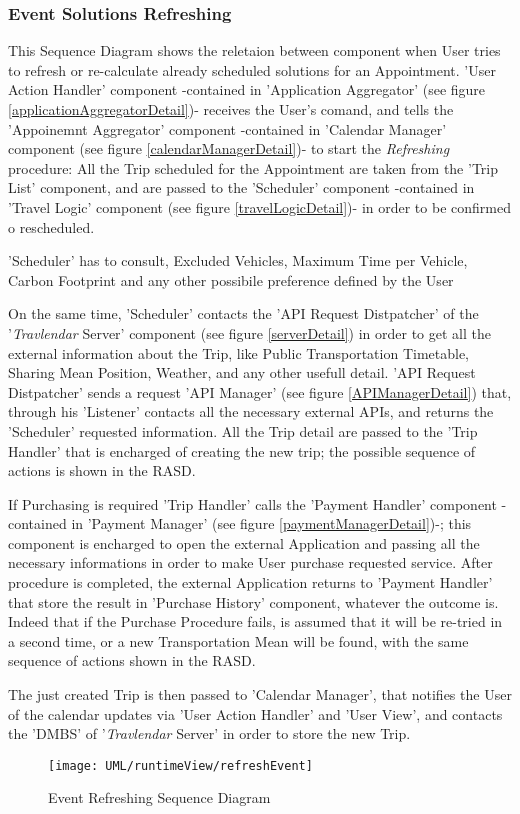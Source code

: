\subsubsection{Event Solutions Refreshing}
	
	This Sequence Diagram shows the reletaion between component when User tries to refresh or re-calculate already scheduled solutions for an Appointment.
	'User Action Handler' component  -contained in 'Application Aggregator' (see figure \ref{applicationAggregatorDetail})- receives the User's comand, and tells the 'Appoinemnt Aggregator' component -contained in 'Calendar Manager' component (see figure \ref{calendarManagerDetail})- to start the \textsl{Refreshing} procedure:
	All the Trip scheduled for the Appointment are taken from the 'Trip List' component, and are passed to the 'Scheduler' component  -contained in 'Travel Logic' component (see figure \ref{travelLogicDetail})-  in order to be confirmed o rescheduled.
	
	'Scheduler' has to consult, Excluded Vehicles, Maximum Time per Vehicle, Carbon Footprint and any other possibile preference defined by the User
	
	On the same time, 'Scheduler' contacts the 'API Request Distpatcher' of the '\textit{Travlendar} Server' component (see figure \ref{serverDetail}) in order to get all the external information about the Trip, like Public Transportation Timetable, Sharing Mean Position, Weather, and any other usefull detail.
	'API Request Distpatcher' sends a request 'API Manager' (see figure \ref{APIManagerDetail}) that, through his 'Listener' contacts all the necessary external APIs, and returns the 'Scheduler' requested information.
	All the Trip detail are passed to the 'Trip Handler' that is encharged of creating the new trip; the possible sequence of actions is shown in the RASD.
	
	If Purchasing is required 'Trip Handler' calls the 'Payment Handler' component  -contained in 'Payment Manager' (see figure \ref{paymentManagerDetail})-; this component is encharged to open the external Application and passing all the necessary informations in order to make User purchase requested service.
	After procedure is completed, the external Application returns to 'Payment Handler' that store the result in 'Purchase History' component, whatever the outcome is.
	Indeed that if the Purchase Procedure fails, is assumed that it will be re-tried in a second time, or a new Transportation Mean will be found, with the same sequence of actions shown in the RASD.
	
	The just created Trip is then passed to 'Calendar Manager', that notifies the User of the calendar updates via 'User Action Handler' and 'User View', and contacts the 'DMBS' of '\textit{Travlendar} Server' in order to store the new Trip.
	
	
	\begin{figure}[H]
		\centering
		\texttt{[image: UML/runtimeView/refreshEvent]}
		\caption{Event Refreshing Sequence Diagram}
		\label{refreshRunTimeView}
	\end{figure}
	
	
	
